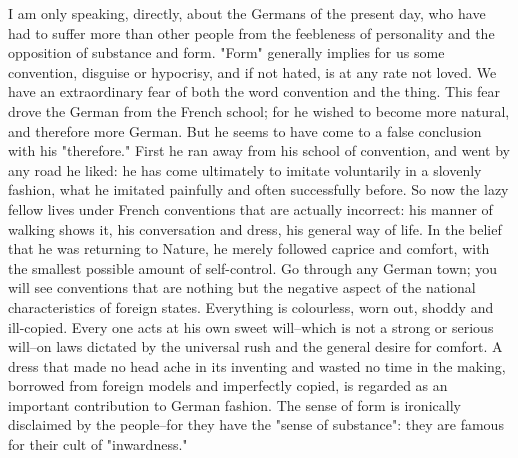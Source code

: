 I am only speaking, directly, about the Germans of the present day,
who have had to suffer more than other people from the feebleness of
personality and the opposition of substance and form. "Form"
generally implies for us some convention, disguise or hypocrisy, and
if not hated, is at any rate not loved. We have an extraordinary fear
of both the word convention and the thing. This fear drove the German
from the French school; for he wished to become more natural, and
therefore more German. But he seems to have come to a false
conclusion with his "therefore." First he ran away from his school of
convention, and went by any road he liked: he has come ultimately to
imitate voluntarily in a slovenly fashion, what he imitated painfully
and often successfully before. So now the lazy fellow lives under
French conventions that are actually incorrect: his manner of walking
shows it, his conversation and dress, his general way of life. In the
belief that he was returning to Nature, he merely followed caprice
and comfort, with the smallest possible amount of self-control. Go
through any German town; you will see conventions that are nothing
but the negative aspect of the national characteristics of foreign
states. Everything is colourless, worn out, shoddy and ill-copied.
Every one acts at his own sweet will--which is not a strong or
serious will--on laws dictated by the universal rush and the general
desire for comfort. A dress that made no head ache in its inventing
and wasted no time in the making, borrowed from foreign models and
imperfectly copied, is regarded as an important contribution to
German fashion. The sense of form is ironically disclaimed by the
people--for they have the "sense of substance": they are famous for
their cult of "inwardness."

